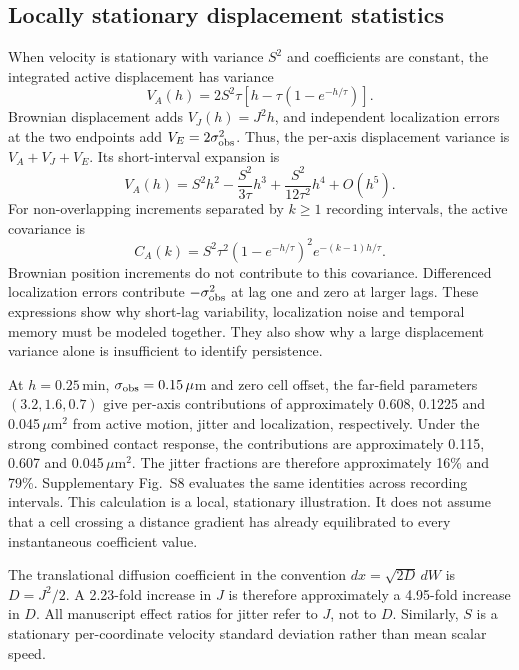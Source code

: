 \documentclass[11pt]{article}
\begin{document}
\subsection{Locally stationary displacement statistics}
When velocity is stationary with variance $S^2$ and coefficients are constant, the integrated active displacement has variance
\begin{equation}
 V_A(h)=2S^2\tau[h-\tau(1-e^{-h/\tau})].
\end{equation}
Brownian displacement adds $V_J(h)=J^2h$, and independent localization errors at the two endpoints add $V_E=2\sigma_{\rm obs}^2$. Thus, the per-axis displacement variance is $V_A+V_J+V_E$. Its short-interval expansion is
\begin{equation}
 V_A(h)=S^2h^2-\frac{S^2}{3\tau}h^3+\frac{S^2}{12\tau^2}h^4+O(h^5).
\end{equation}
For non-overlapping increments separated by $k\geq1$ recording intervals, the active covariance is
\begin{equation}
 C_A(k)=S^2\tau^2(1-e^{-h/\tau})^2e^{-(k-1)h/\tau}.
\end{equation}
Brownian position increments do not contribute to this covariance. Differenced localization errors contribute $-\sigma_{\rm obs}^2$ at lag one and zero at larger lags. These expressions show why short-lag variability, localization noise and temporal memory must be modeled together. They also show why a large displacement variance alone is insufficient to identify persistence.

At $h=0.25$\,min, $\sigma_{\rm obs}=0.15\,\mu$m and zero cell offset, the far-field parameters $(3.2,1.6,0.7)$ give per-axis contributions of approximately 0.608, 0.1225 and 0.045\,$\mu$m$^2$ from active motion, jitter and localization, respectively. Under the strong combined contact response, the contributions are approximately 0.115, 0.607 and 0.045\,$\mu$m$^2$. The jitter fractions are therefore approximately 16\% and 79\%. Supplementary Fig.~S8 evaluates the same identities across recording intervals. This calculation is a local, stationary illustration. It does not assume that a cell crossing a distance gradient has already equilibrated to every instantaneous coefficient value.

The translational diffusion coefficient in the convention $dx=\sqrt{2D}\,dW$ is $D=J^2/2$. A 2.23-fold increase in $J$ is therefore approximately a 4.95-fold increase in $D$. All manuscript effect ratios for jitter refer to $J$, not to $D$. Similarly, $S$ is a stationary per-coordinate velocity standard deviation rather than mean scalar speed.
\end{document}
